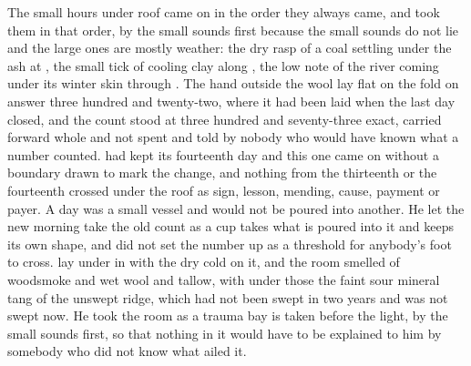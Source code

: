 
The small hours under  roof came on in the order they always came, and  took them in that order, by the small sounds first because the small sounds do not lie and the large ones are mostly weather: the dry rasp of a coal settling under the ash at , the small tick of cooling clay along , the low note of the river coming under its winter skin through . The hand outside the wool lay flat on the fold on answer three hundred and twenty-two, where it had been laid when the last day closed, and the count stood at three hundred and seventy-three exact, carried forward whole and not spent and told by nobody who would have known what a number counted.  had kept its fourteenth day and this one came on without a boundary drawn to mark the change, and nothing from the thirteenth or the fourteenth crossed under the roof as sign, lesson, mending, cause, payment or payer. A day was a small vessel and would not be poured into another. He let the new morning take the old count as a cup takes what is poured into it and keeps its own shape, and did not set the number up as a threshold for anybody's foot to cross.  lay under  in  with the dry cold on it, and the room smelled of woodsmoke and wet wool and tallow, with under those the faint sour mineral tang of the unswept ridge, which had not been swept in two years and was not swept now. He took the room as a trauma bay is taken before the light, by the small sounds first, so that nothing in it would have to be explained to him by somebody who did not know what ailed it.

